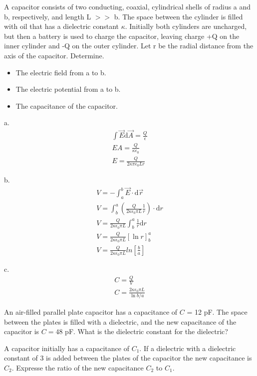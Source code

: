 \documentclass[../em.tex]{subfiles}
\begin{document}
\begin{example}
    A capacitor consists of two conducting, coaxial, cylindrical shells of radius a and b, respectively,
    and length L $>>$ b. The space between the cylinder is filled with oil that has a dielectric constant $\kappa$.
    Initially both cylinders are uncharged, but then a battery is used to charge the capacitor, leaving charge +Q 
    on the inner cylinder and -Q on the outer cylinder. Let r be the radial distance from the axis of the capacitor.
    Determine.
    \begin{itemize}
        \item The electric field from a to b.
        \item The electric potential from a to b.
        \item The capacitance of the capacitor.
    \end{itemize}

    a.
    \begin{align*}
        \int \vec{E}\mathrm{d}\vec{A}=\frac{Q}{\epsilon}\\ 
        EA = \frac{Q}{\kappa\epsilon_0}\\
        E = \frac{Q}{2\kappa \pi\epsilon_0 L r}
    \end{align*} 

    b.
    \begin{align*}
        V = -\int_a^b \vec{E}\cdot\mathrm{d}\vec{r}\\
        V = \int^a_b \left(\frac{Q}{2\kappa\epsilon_0 \pi L}\frac{1}{r}\right)\cdot \mathrm{d}r\\
        V = \frac{Q}{2\kappa\epsilon_0\pi L}\int_b^a \frac{1}{r}\mathrm{d}r\\
        V = \frac{Q}{2\kappa\epsilon_0\pi L}[\ln r]^a_b \\
        V = \frac{Q}{2\kappa\epsilon_0\pi L}ln\left[\frac{b}{a}\right]
    \end{align*}

    c.
    \begin{align*}
        C = \frac{Q}{V}\\
        C = \frac{2\kappa \epsilon_0 \pi L}{\ln b/a}
    \end{align*}

\end{example}
\ex An air-filled parallel plate capacitor has a capacitance of $C$ = 12 pF. The space between the plates is filled with a dielectric, and the new capacitance of the capacitor is $C=48$ pF. What is the dielectric constant for the dielectric?

\ex A capacitor initially has a capacitance of $C_1$. If a dielectric with a dielectric constant of 3 is added between the plates of the capacitor the new 
capacitance is $C_2$. Expresse the ratio of the new capacitance $C_2$ to $C_1$.
\end{document}
